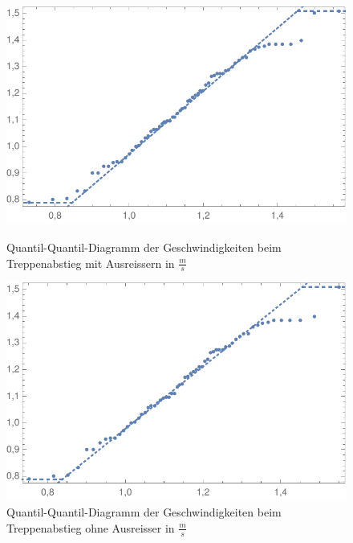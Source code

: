 \begin{figure}[!htb]
    \centering
    \begin{minipage}{.49\textwidth}
        \centering
        \includegraphics[width=\textwidth]{abbildungen/QQ_Plot_2017_TreppeAb_MitAusreisser.pdf}
        \caption{Quantil-Quantil-Diagramm der Geschwindigkeiten beim Treppenabstieg mit Ausreissern in $\frac{m}{s}$}
        \label{fig:QQ_TreppeAb_MA}
    \end{minipage}%
    \begin{minipage}{0.02\textwidth}
     \hfill
    \end{minipage}%
    \begin{minipage}{0.49\textwidth}
        \centering
        \includegraphics[width=\textwidth]{abbildungen/QQ_Plot_2017_TreppeAb_OhneAusreisser.pdf}
        \caption{Quantil-Quantil-Diagramm der Geschwindigkeiten beim Treppenabstieg ohne Ausreisser in $\frac{m}{s}$}
        \label{fig:QQ_TreppeAb_OA}
    \end{minipage}
\end{figure}


